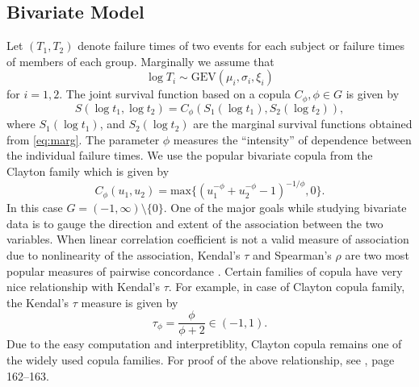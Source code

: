 \documentclass[11pt]{article}
\theoremstyle{remboldstyle}
\begin{document}
\subsection{Bivariate Model}
\noindent
Let $(T_1, T_2)$ denote failure times of two events for each subject or failure times
of members of each group. Marginally we assume that
\begin{equation}
  \label{eq:marg}
\log T_i \sim \mbox{GEV} (\mu_i, \sigma_i, \xi_i)
\end{equation}
for $i= 1,2$. The joint survival function based on a copula $C_{\phi}, \phi \in G$ is given by
\begin{equation}
  \label{eq:survcop}
  S(\log t_1, \log t_2) = C_\phi (S_1(\log t_1), S_2(\log t_2)),
\end{equation}
where $S_1(\log t_1)$, and $S_2(\log t_2)$ are the marginal survival functions obtained from \eqref{eq:marg}. The parameter $\phi$ measures the ``intensity'' of dependence between the individual failure
times. We use the popular bivariate copula from the Clayton family which is given by
\begin{equation}
  \label{eq:clay}
  C_\phi (u_1, u_2) = \mbox{max} \{(u_1^{-\phi} + u_2^{-\phi} - 1)^{-1/\phi}, 0\} .
\end{equation}
In this case $G= (-1, \infty)\setminus \{0\}$. One of the major goals while studying bivariate data is to gauge the direction and extent of the association between the two variables. When linear correlation coefficient is not a valid measure of association due to nonlinearity of the association, Kendal's $\tau$ and Spearman's $\rho$ are two most popular measures of pairwise concordance \cite[][chapter 5]{nelson:1999}. Certain families of copula have very nice relationship with Kendal's $\tau$. For example, in case of Clayton copula family, the Kendal's $\tau$ measure is given by
\[
\tau_\phi = \frac{\phi}{\phi+2} \in (-1,1).
\]
Due to the easy computation and interpretiblity, Clayton copula remains one of the widely used copula families. 
For proof of the above relationship, see \cite{nelson:1999}, page 162--163.
\end{document}
